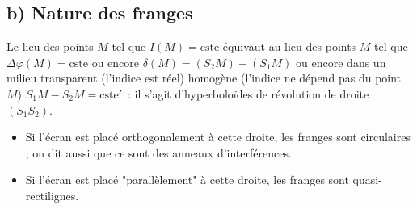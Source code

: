 \documentclass{article}
\begin{document}
\subsection*{b) Nature des franges}
Le lieu des points $M$ tel que $I(M) = \mathrm{cste}$ équivaut au lieu des
points $M$ tel que $\Delta \varphi(M) = \mathrm{cste}$ ou encore $\delta (M)
= \left(S_{2}M\right)-\left(S_{1}M\right)$ ou encore dans un milieu transparent (l'indice
est réel) homogène (l'indice ne dépend pas du point $M$)
$S_{1}M-S_{2}M = \mathrm{cste}'$ : il s'agit d'hyperboloïdes de révolution de
droite $\left(S_{1}S_{2}\right)$.
\begin{itemize}
\item Si l'écran est placé orthogonalement à cette droite, les franges
sont circulaires ; on dit aussi que ce sont des anneaux
d'interférences.
\item Si l'écran est placé "parallèlement" à cette
droite, les franges sont quasi-rectilignes.
\end{itemize}
\end{document}
